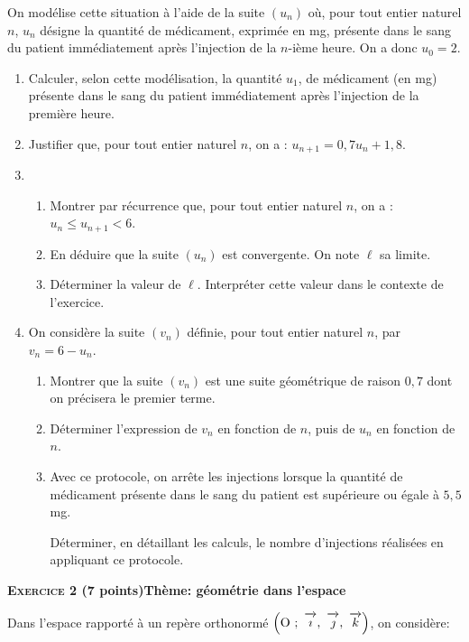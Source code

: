 \documentclass[11pt,a4paper,french]{article}
\newcommand{\vect}[1]{\overrightarrow{\,\mathstrut#1\,}}
\def\Oijk{$\left(\text{O}~;~\vect{\imath},~\vect{\jmath},~\vect{k}\right)$}
\begin{document}
On modélise cette situation à l'aide de la suite $\left(u_n\right)$ où, pour tout entier naturel $n$, $u_n$ désigne la quantité de médicament, exprimée en mg, présente dans le sang du patient immédiatement après l'injection de la $n$-ième heure. On a donc $u_0 = 2$.

\medskip

\begin{enumerate}
\item Calculer, selon cette modélisation, la quantité $u_1$, de médicament (en mg) présente dans le sang du patient immédiatement après l'injection de la première heure.
\item Justifier que, pour tout entier naturel $n$, on a : $u_{n+1} = 0,7u_n + 1,8$.
\item 
	\begin{enumerate}
		\item Montrer par récurrence que, pour tout entier naturel $n$, on a : $u_n \leqslant u_{n+1}  < 6$.
		\item En déduire que la suite $\left(u_n\right)$ est convergente. On note $\ell$ sa limite.
		\item Déterminer la valeur de $\ell$. Interpréter cette valeur dans le contexte de l'exercice.
	\end{enumerate}	
\item On considère la suite $\left(v_n\right)$ définie, pour tout entier naturel $n$, par $v_n = 6 - u_n$.
	\begin{enumerate}
		\item Montrer que la suite $\left(v_n\right)$ est une suite géométrique de raison $0,7$ dont on précisera le premier terme.
		\item Déterminer l'expression de $v_n$ en fonction de $n$, puis de $u_n$ en fonction de $n$.
		\item Avec ce protocole, on arrête les injections lorsque la quantité de médicament présente dans le sang du patient est supérieure ou égale à $5,5$ mg.

Déterminer, en détaillant les calculs, le nombre d'injections réalisées en appliquant ce protocole.
	\end{enumerate}
\end{enumerate}

\bigskip

\textbf{\textsc{Exercice 2}  \quad (7 points)\hfill Thème: géométrie dans l'espace}

\medskip

Dans l'espace rapporté à un repère orthonormé \Oijk, on considère:
\end{document}
